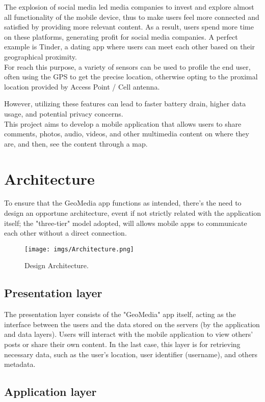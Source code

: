 \documentclass[conference]{IEEEtran}
\begin{document}
The explosion of social media led media companies to invest and explore almost all functionality of the mobile device, thus to make users feel more connected and satisfied by providing more relevant content. As a result, users spend more time on these platforms, generating profit for social media companies.
A perfect example is Tinder, a dating app where users can meet each other based on their geographical proximity.
\\
For reach this purpose, a variety of sensors can be used to profile the end user, often using the GPS to get the precise location, otherwise opting to the proximal location provided by Access Point / Cell antenna.

However, utilizing these features can lead to faster battery drain, higher data usage, and potential privacy concerns.
\\
This project aims to develop a mobile application that allows users to share comments, photos, audio, videos, and other multimedia content on where they are, and then, see the content through a map.

\section{Architecture}


To ensure that the GeoMedia app functions as intended, there's the need to design an opportune architecture, event if not strictly related with the application itself; the "three-tier" model adopted, will allows mobile apps to communicate each other without a direct connection.

\begin{figure}[htbp]
{\texttt{[image: imgs/Architecture.png]}}
\caption{Design Architecture.}
\label{fig}
\end{figure}

\subsection{Presentation layer}
The presentation layer consists of the "GeoMedia" app itself, acting as the interface between the users and the data stored on the servers (by the application and data layers). Users will interact with the mobile application to view others' posts or share their own content.
In the last case, this layer is for retrieving necessary data, such as the user's location, user identifier (username), and others metadata.

\subsection{Application layer}
\end{document}
